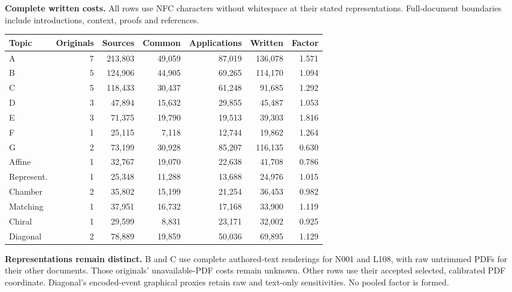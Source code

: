 \documentclass[11pt,a4paper]{article}
\newcommand{\tabsetup}{\small\setlength{\tabcolsep}{4pt}\renewcommand{\arraystretch}{1.10}}
\begin{document}
\textbf{Complete written costs.} All rows use NFC characters without whitespace at their stated representations. Full-document boundaries include introductions, context, proofs and references.
\begin{center}\tabsetup\begin{tabular}{lrrrrrr}\toprule
Topic & Originals & Sources & Common & Applications & Written & Factor\\\midrule
A & 7 & 213,803 & 49,059 & 87,019 & 136,078 & 1.571 \\
B & 5 & 124,906 & 44,905 & 69,265 & 114,170 & 1.094 \\
C & 5 & 118,433 & 30,437 & 61,248 & 91,685 & 1.292 \\
D & 3 & 47,894 & 15,632 & 29,855 & 45,487 & 1.053 \\
E & 3 & 71,375 & 19,790 & 19,513 & 39,303 & 1.816 \\
F & 1 & 25,115 & 7,118 & 12,744 & 19,862 & 1.264 \\
G & 2 & 73,199 & 30,928 & 85,207 & 116,135 & 0.630 \\
Affine & 1 & 32,767 & 19,070 & 22,638 & 41,708 & 0.786 \\
Represent. & 1 & 25,348 & 11,288 & 13,688 & 24,976 & 1.015 \\
Chamber & 2 & 35,802 & 15,199 & 21,254 & 36,453 & 0.982 \\
Matching & 1 & 37,951 & 16,732 & 17,168 & 33,900 & 1.119 \\
Chiral & 1 & 29,599 & 8,831 & 23,171 & 32,002 & 0.925 \\
Diagonal & 2 & 78,889 & 19,859 & 50,036 & 69,895 & 1.129 \\
\bottomrule\end{tabular}\end{center}
\textbf{Representations remain distinct.} B and C use complete authored-text renderings for N001 and L108, with raw untrimmed PDFs for their other documents. Those originals' unavailable-PDF costs remain unknown. Other rows use their accepted selected, calibrated PDF coordinate. Diagonal's encoded-event graphical proxies retain raw and text-only sensitivities. No pooled factor is formed.
\end{document}
